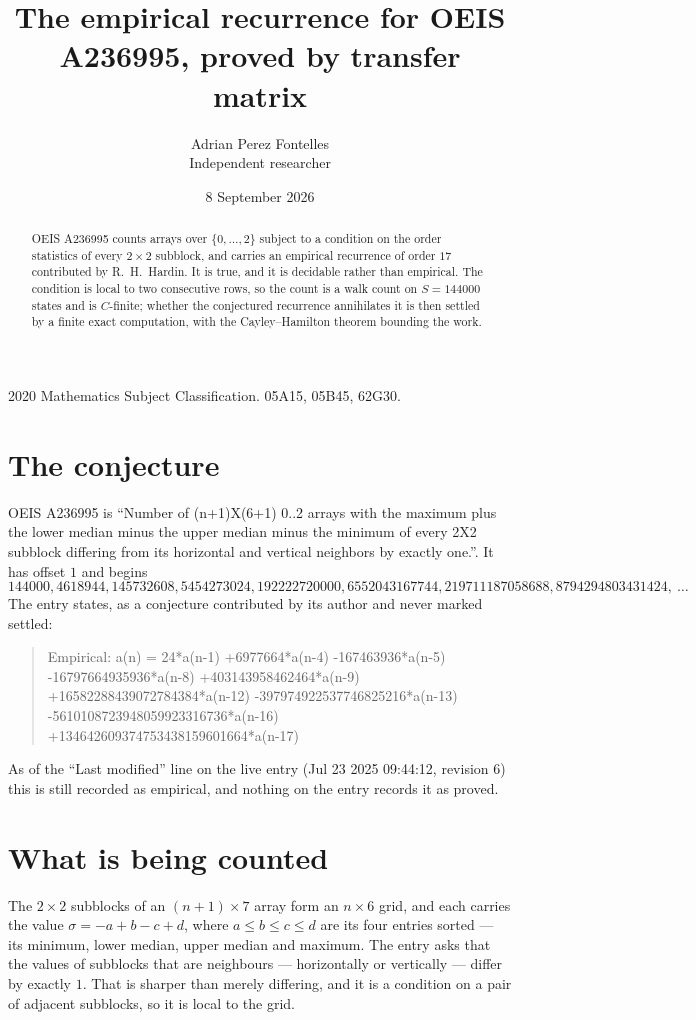 \documentclass[11pt,a4paper]{article}
\title{The empirical recurrence for OEIS A236995, proved by transfer matrix}
\author{Adrian Perez Fontelles\\ \small Independent researcher}
\date{8 September 2026}
\theoremstyle{plain}
\theoremstyle{definition}
\begin{document}
\maketitle

\begin{abstract}
OEIS A236995 counts arrays over $\{0,\dots,2\}$ subject to a condition on the order
statistics of every $2\times2$ subblock, and carries an empirical recurrence of order
$17$ contributed by R.~H.~Hardin. It is true, and it is decidable rather than empirical.
The condition is local to two consecutive rows, so the count is a walk count on $S=144000$
states and is $C$-finite; whether the conjectured recurrence annihilates it is then settled by
a finite exact computation, with the Cayley--Hamilton theorem bounding the work.
\end{abstract}

\noindent\small 2020 Mathematics Subject Classification. 05A15, 05B45, 62G30.\normalsize

\section{The conjecture}

OEIS A236995 is ``Number of (n+1)X(6+1) 0..2 arrays with the maximum plus the lower median minus the upper median minus the minimum of every 2X2 subblock differing from its horizontal and vertical neighbors by exactly one.''. It has offset $1$ and begins
\[
144000, 4618944, 145732608, 5454273024, 192222720000, 6552043167744, 219711187058688, 8794294803431424,\ \dots
\]
The entry states, as a conjecture contributed by its author and never marked settled:
\begin{quote}
Empirical: a(n) = 24*a(n-1) +6977664*a(n-4) -167463936*a(n-5) -16797664935936*a(n-8) +403143958462464*a(n-9) +16582288439072784384*a(n-12) -397974922537746825216*a(n-13) -5610108723948059923316736*a(n-16) +134642609374753438159601664*a(n-17)
\end{quote}
As of the ``Last modified'' line on the live entry (Jul 23 2025 09:44:12, revision 6) this is still
recorded as empirical, and nothing on the entry records it as proved.

\section{What is being counted}

The $2\times2$ subblocks of an $(n+1)\times7$ array form an
$n\times6$ grid, and each carries the value $\sigma=-a+b-c+d$, where $a\le b\le c\le d$ are its four entries sorted --- its minimum, lower median, upper median and maximum. The entry asks that the values of
subblocks that are neighbours --- horizontally or vertically --- differ by exactly $1$.
That is sharper than merely differing, and it is a condition on a pair of adjacent subblocks,
so it is local to the grid.
\end{document}
